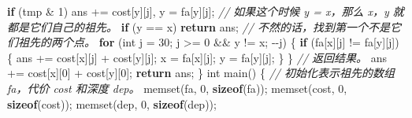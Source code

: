 \documentclass[
]{article}
\newenvironment{Shaded}{}{}
\newcommand{\CommentTok}[1]{\textcolor[rgb]{0.38,0.63,0.69}{\textit{#1}}}
\newcommand{\ControlFlowTok}[1]{\textcolor[rgb]{0.00,0.44,0.13}{\textbf{#1}}}
\newcommand{\DataTypeTok}[1]{\textcolor[rgb]{0.56,0.13,0.00}{#1}}
\newcommand{\DecValTok}[1]{\textcolor[rgb]{0.25,0.63,0.44}{#1}}
\newcommand{\KeywordTok}[1]{\textcolor[rgb]{0.00,0.44,0.13}{\textbf{#1}}}
\newcommand{\NormalTok}[1]{#1}
\newcommand{\OperatorTok}[1]{\textcolor[rgb]{0.40,0.40,0.40}{#1}}
\begin{document}
\begin{Shaded}
\begin{Highlighting}[]
    \ControlFlowTok{if} \OperatorTok{(}\NormalTok{tmp }\OperatorTok{\&} \DecValTok{1}\OperatorTok{)}\NormalTok{ ans }\OperatorTok{+=}\NormalTok{ cost}\OperatorTok{[}\NormalTok{y}\OperatorTok{][}\NormalTok{j}\OperatorTok{],}\NormalTok{ y }\OperatorTok{=}\NormalTok{ fa}\OperatorTok{[}\NormalTok{y}\OperatorTok{][}\NormalTok{j}\OperatorTok{];}
  \CommentTok{// 如果这个时候 y = x，那么 x，y 就都是它们自己的祖先。}
  \ControlFlowTok{if} \OperatorTok{(}\NormalTok{y }\OperatorTok{==}\NormalTok{ x}\OperatorTok{)} \ControlFlowTok{return}\NormalTok{ ans}\OperatorTok{;}
  \CommentTok{// 不然的话，找到第一个不是它们祖先的两个点。}
  \ControlFlowTok{for} \OperatorTok{(}\DataTypeTok{int}\NormalTok{ j }\OperatorTok{=} \DecValTok{30}\OperatorTok{;}\NormalTok{ j }\OperatorTok{\textgreater{}=} \DecValTok{0} \OperatorTok{\&\&}\NormalTok{ y }\OperatorTok{!=}\NormalTok{ x}\OperatorTok{;} \OperatorTok{{-}{-}}\NormalTok{j}\OperatorTok{)} \OperatorTok{\{}
    \ControlFlowTok{if} \OperatorTok{(}\NormalTok{fa}\OperatorTok{[}\NormalTok{x}\OperatorTok{][}\NormalTok{j}\OperatorTok{]} \OperatorTok{!=}\NormalTok{ fa}\OperatorTok{[}\NormalTok{y}\OperatorTok{][}\NormalTok{j}\OperatorTok{])} \OperatorTok{\{}
\NormalTok{      ans }\OperatorTok{+=}\NormalTok{ cost}\OperatorTok{[}\NormalTok{x}\OperatorTok{][}\NormalTok{j}\OperatorTok{]} \OperatorTok{+}\NormalTok{ cost}\OperatorTok{[}\NormalTok{y}\OperatorTok{][}\NormalTok{j}\OperatorTok{];}
\NormalTok{      x }\OperatorTok{=}\NormalTok{ fa}\OperatorTok{[}\NormalTok{x}\OperatorTok{][}\NormalTok{j}\OperatorTok{];}
\NormalTok{      y }\OperatorTok{=}\NormalTok{ fa}\OperatorTok{[}\NormalTok{y}\OperatorTok{][}\NormalTok{j}\OperatorTok{];}
    \OperatorTok{\}}
  \OperatorTok{\}}
  \CommentTok{// 返回结果。}
\NormalTok{  ans }\OperatorTok{+=}\NormalTok{ cost}\OperatorTok{[}\NormalTok{x}\OperatorTok{][}\DecValTok{0}\OperatorTok{]} \OperatorTok{+}\NormalTok{ cost}\OperatorTok{[}\NormalTok{y}\OperatorTok{][}\DecValTok{0}\OperatorTok{];}
  \ControlFlowTok{return}\NormalTok{ ans}\OperatorTok{;}
\OperatorTok{\}}
\DataTypeTok{int}\NormalTok{ main}\OperatorTok{()} \OperatorTok{\{}
  \CommentTok{// 初始化表示祖先的数组 fa，代价 cost 和深度 dep。}
\NormalTok{  memset}\OperatorTok{(}\NormalTok{fa}\OperatorTok{,} \DecValTok{0}\OperatorTok{,} \KeywordTok{sizeof}\OperatorTok{(}\NormalTok{fa}\OperatorTok{));}
\NormalTok{  memset}\OperatorTok{(}\NormalTok{cost}\OperatorTok{,} \DecValTok{0}\OperatorTok{,} \KeywordTok{sizeof}\OperatorTok{(}\NormalTok{cost}\OperatorTok{));}
\NormalTok{  memset}\OperatorTok{(}\NormalTok{dep}\OperatorTok{,} \DecValTok{0}\OperatorTok{,} \KeywordTok{sizeof}\OperatorTok{(}\NormalTok{dep}\OperatorTok{));}

\end{Highlighting}
\end{Shaded}
\end{document}
